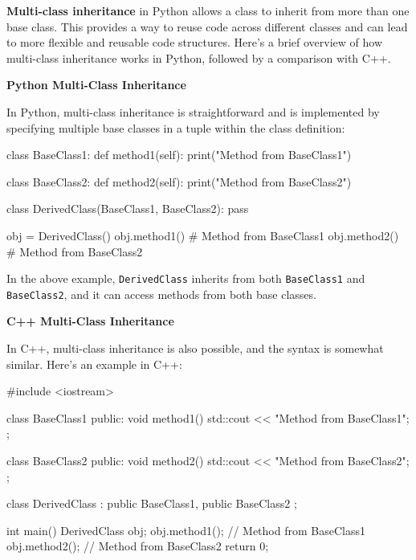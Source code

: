 \begin{airesult}
\vsp

\textbf{Multi-class inheritance} in Python allows a class to inherit from more
than one base class. This provides a way to reuse code across different classes
and can lead to more flexible and reusable code structures. Here's a brief
overview of how multi-class inheritance works in Python, followed by a
comparison with C++.

\vsp

\textbf{Python Multi-Class Inheritance}

\vsp

In Python, multi-class inheritance is straightforward and is implemented by
specifying multiple base classes in a tuple within the class definition:

\begin{python}
class BaseClass1:
  def method1(self):
    print("Method from BaseClass1")

class BaseClass2:
  def method2(self):
    print("Method from BaseClass2")

class DerivedClass(BaseClass1, BaseClass2):
  pass

obj = DerivedClass()
obj.method1()  # Method from BaseClass1
obj.method2()  # Method from BaseClass2
\end{python}

In the above example, \verb|DerivedClass| inherits from both \verb|BaseClass1|
and \verb|BaseClass2|, and it can access methods from both base classes.

\vsp

\textbf{C++ Multi-Class Inheritance}

\vsp

In C++, multi-class inheritance is also possible, and the syntax is somewhat
similar. Here's an example in C++:

\begin{cpp}
#include <iostream>

class BaseClass1 {
public:
  void method1() {
    std::cout << "Method from BaseClass1\n";
  }
};

class BaseClass2 {
public:
  void method2() {
    std::cout << "Method from BaseClass2\n";
  }
};

class DerivedClass : public BaseClass1, public BaseClass2 {
};

int main() {
  DerivedClass obj;
  obj.method1(); // Method from BaseClass1
  obj.method2(); // Method from BaseClass2
  return 0;
}
\end{cpp}


\end{airesult}
